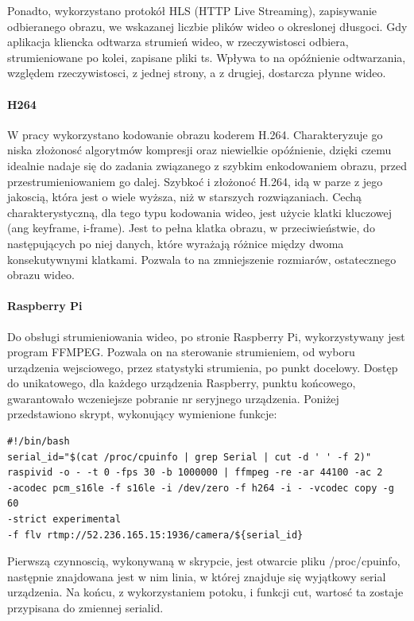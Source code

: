 Ponadto, wykorzystano protokół HLS (HTTP Live Streaming), zapisywanie odbieranego obrazu, we wskazanej liczbie plików wideo o okreslonej dłusgoci. Gdy aplikacja kliencka odtwarza strumień wideo, w rzeczywistosci odbiera, strumieniowane po kolei, zapisane pliki ts. Wpływa to na opóźnienie odtwarzania, względem rzeczywistosci, z jednej strony, a z drugiej, dostarcza płynne wideo.

\paragraph{H264}
W pracy wykorzystano kodowanie obrazu koderem H.264. Charakteryzuje go niska złożonosć algorytmów kompresji oraz niewielkie opóźnienie, dzięki czemu idealnie nadaje się do zadania związanego z szybkim enkodowaniem obrazu, przed przestrumieniowaniem go dalej.
Szybkoć i złożonoć H.264, idą w parze z jego jakoscią, która jest o wiele wyższa, niż w starszych rozwiązaniach.
Cechą charakterystyczną, dla tego typu kodowania wideo, jest użycie klatki kluczowej (ang keyframe, i-frame). Jest to pełna klatka obrazu, w przeciwieństwie, do następujących po niej danych, które wyrażają różnice między dwoma konsekutywnymi klatkami. Pozwala to na zmniejszenie rozmiarów, ostatecznego obrazu wideo.

\paragraph{Raspberry Pi}
Do obsługi strumieniowania wideo, po stronie Raspberry Pi, wykorzystywany jest program FFMPEG. Pozwala on na sterowanie strumieniem, od wyboru urządzenia wejsciowego, przez statystyki strumienia, po punkt docelowy. Dostęp do unikatowego, dla każdego urządzenia Raspberry, punktu końcowego, gwarantowało wczeniejsze pobranie nr seryjnego urządzenia. Poniżej przedstawiono skrypt, wykonujący wymienione funkcje:
\begin{verbatim}
#!/bin/bash
serial_id="$(cat /proc/cpuinfo | grep Serial | cut -d ' ' -f 2)"
raspivid -o - -t 0 -fps 30 -b 1000000 | ffmpeg -re -ar 44100 -ac 2 
-acodec pcm_s16le -f s16le -i /dev/zero -f h264 -i - -vcodec copy -g 60 
-strict experimental 
-f flv rtmp://52.236.165.15:1936/camera/${serial_id}
\end{verbatim}
Pierwszą czynnoscią, wykonywaną w skrypcie, jest otwarcie pliku /proc/cpuinfo, następnie znajdowana jest w nim linia, w której znajduje się wyjątkowy serial urządzenia. Na końcu, z wykorzystaniem potoku, i funkcji cut, wartosć ta zostaje przypisana do zmiennej serialid.

